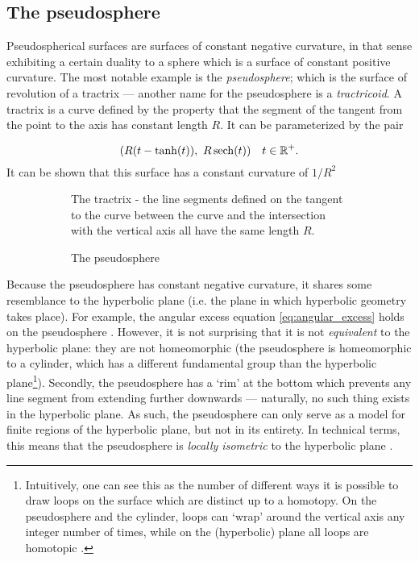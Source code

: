 \subsection{The pseudosphere}
Pseudospherical surfaces are surfaces of constant negative curvature, in that sense exhibiting a certain duality to a sphere which is a surface of constant positive curvature. The most notable example is the \emph{pseudosphere}; which is the surface of revolution of a tractrix --- another name for the pseudosphere is a \emph{tractricoid}. A tractrix is a curve defined by the property that the segment of the tangent from the point to the axis has constant length \(R\). It can be parameterized by the pair


    \[ 
        \qty(R(t - \tanh(t)),\ R\sech(t)) \quad t \in \real^+.
    \]
It can be shown that this surface has a constant curvature of \(1/R^2\)
\begin{figure}[ht]
    \begin{subfigure}[b]{0.5\textwidth}
        \centering
        
        \caption{The tractrix - the line segments defined on the tangent to the curve between the curve and the intersection with the vertical axis all have the same length \(R\).}
        \label{fig:tractrix}
    \end{subfigure}
    \begin{subfigure}[b]{0.45\textwidth}
        \centering
        
        \caption{The pseudosphere}
        \label{fig:pseudosphere}
    \end{subfigure}
    \caption{}
\end{figure}
Because the pseudosphere has constant negative curvature, it shares some resemblance to the hyperbolic plane (i.e. the plane in which hyperbolic geometry takes place). For example, the angular excess equation \cref{eq:angular_excess} holds on the pseudosphere \cite{Needham1997}. However, it is not surprising that it is not \emph{equivalent} to the hyperbolic plane: they are not homeomorphic (the pseudosphere is homeomorphic to a cylinder, which has a different fundamental group than the hyperbolic plane\footnote{Intuitively, one can see this as the number of different ways it is possible to draw loops on the surface which are distinct up to a homotopy. On the pseudosphere and the cylinder, loops can `wrap' around the vertical axis any integer number of times, while on the (hyperbolic) plane all loops are homotopic \cite{Lee2000}.}). Secondly, the pseudosphere has a `rim' at the bottom which prevents any line segment from extending further downwards --- naturally, no such thing exists in the hyperbolic plane. As such, the pseudosphere can only serve as a model for finite regions of the hyperbolic plane, but not in its entirety. In technical terms, this means that the pseudosphere is \emph{locally isometric} to the hyperbolic plane \cite{Ghys2010}.

